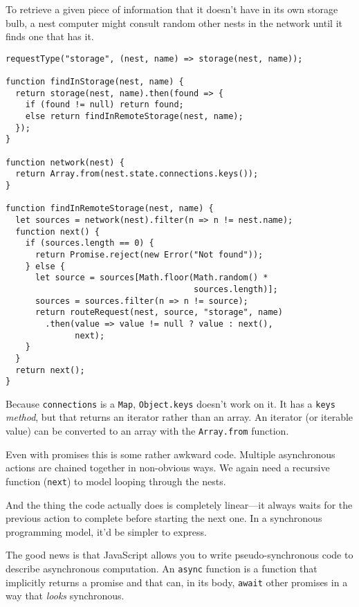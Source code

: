 To retrieve a given piece of information that it doesn't have in its own storage bulb, a nest computer might consult random other nests in the network until it finds one that has it.

\begin{lstlisting}
requestType("storage", (nest, name) => storage(nest, name));

function findInStorage(nest, name) {
  return storage(nest, name).then(found => {
    if (found != null) return found;
    else return findInRemoteStorage(nest, name);
  });
}

function network(nest) {
  return Array.from(nest.state.connections.keys());
}

function findInRemoteStorage(nest, name) {
  let sources = network(nest).filter(n => n != nest.name);
  function next() {
    if (sources.length == 0) {
      return Promise.reject(new Error("Not found"));
    } else {
      let source = sources[Math.floor(Math.random() *
                                      sources.length)];
      sources = sources.filter(n => n != source);
      return routeRequest(nest, source, "storage", name)
        .then(value => value != null ? value : next(),
              next);
    }
  }
  return next();
}
\end{lstlisting}
\noindent{}

Because \lstinline`connections` is a \lstinline`Map`, \lstinline`Object.keys` doesn't work on it. It has a \lstinline`keys` \emph{method}, but that returns an iterator rather than an array. An iterator (or iterable value) can be converted to an array with the \lstinline`Array.from` function.

Even with promises this is some rather awkward code. Multiple asynchronous actions are chained together in non-obvious ways. We again need a recursive function (\lstinline`next`) to model looping through the nests.

And the thing the code actually does is completely linear—it always waits for the previous action to complete before starting the next one. In a synchronous programming model, it'd be simpler to express.

The good news is that JavaScript allows you to write pseudo-synchronous code to describe asynchronous computation. An \lstinline`async` function is a function that implicitly returns a promise and that can, in its body, \lstinline`await` other promises in a way that \emph{looks} synchronous.

